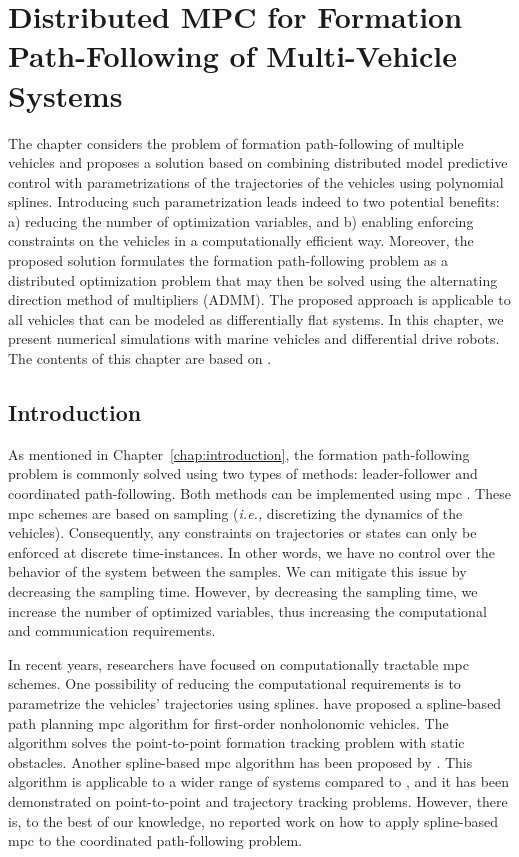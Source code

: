 \chapter{Distributed MPC for Formation Path-Following of Multi-Vehicle Systems}
\label{chap:handpos_MPC}


The chapter considers the problem of formation path-following of multiple vehicles and proposes a solution based on combining distributed model predictive control with parametrizations of the trajectories of the vehicles using polynomial splines. Introducing such parametrization leads indeed to two potential benefits: a) reducing the number of optimization variables, and b) enabling enforcing constraints on the vehicles in a computationally efficient way. Moreover, the proposed solution formulates the formation path-following problem as a distributed optimization problem that may then be solved using the alternating direction method of multipliers (ADMM).
The proposed approach is applicable to all vehicles that can be modeled as differentially flat systems.
In this chapter, we present numerical simulations with marine vehicles and differential drive robots.
The contents of this chapter are based on \cite{matous_MPC_2022}.

\section{Introduction}
    
As mentioned in Chapter~\ref{chap:introduction}, the formation path-following problem is commonly solved using two types of methods: leader-follower and coordinated path-following.
Both methods can be implemented using \acrfull{mpc} \cite{wang_path_2021,kanjanawanishkul_distributed_2008}.
These \gls{mpc} schemes are based on sampling (\emph{i.e.,} discretizing the dynamics of the vehicles).
Consequently, any constraints on trajectories or states can only be enforced at discrete time-instances.
In other words, we have no control over the behavior of the system between the samples.
We can mitigate this issue by decreasing the sampling time.
However, by decreasing the sampling time, we increase the number of optimized variables, thus increasing the computational and communication requirements.

In recent years, researchers have focused on computationally tractable \gls{mpc} schemes.
One possibility of reducing the computational requirements is to parametrize the vehicles' trajectories using splines.
\cite{saska_2016_predictive} have proposed a spline-based path planning \gls{mpc} algorithm for first-order nonholonomic vehicles.
The algorithm solves the point-to-point formation tracking problem with static obstacles.
Another spline-based \gls{mpc} algorithm has been proposed by \cite{van_parys_2017_DMPC}.
This algorithm is applicable to a wider range of systems compared to \cite{saska_2016_predictive}, and it has been demonstrated on point-to-point and trajectory tracking problems.
However, there is, to the best of our knowledge, no reported work on how to apply spline-based \gls{mpc} to the coordinated path-following problem.

